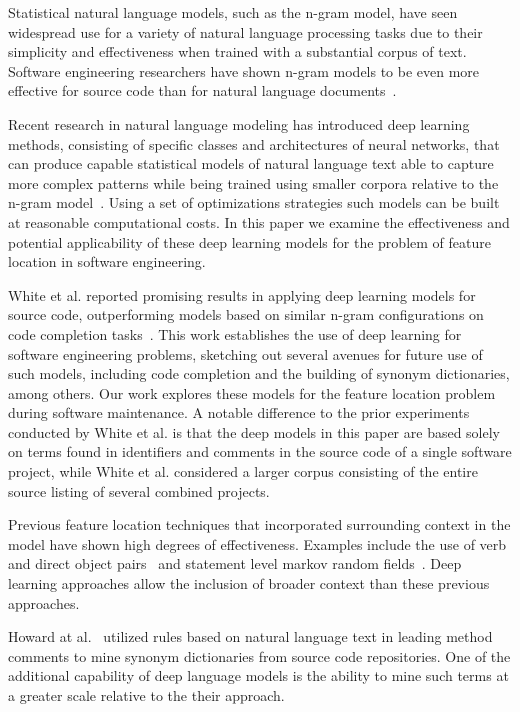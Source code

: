 


%
%
Statistical natural language models, such as the n-gram model, have
seen widespread use for a variety of natural language processing tasks
due to their simplicity and effectiveness when trained with a
substantial corpus of text. Software engineering researchers have
shown n-gram models to be even more effective for source code than for
natural language documents~\cite{hindle_naturalness_2012}. 


Recent research in natural language modeling has introduced deep
learning methods, consisting of specific classes and architectures of
neural networks, that can produce capable statistical models of
natural language text able to capture more complex patterns while
being trained using smaller corpora relative to the n-gram
model~\cite{mikolov_distributed_2013,le_distributed_2014}. Using a set
of optimizations strategies such models can be built at reasonable
computational costs. In this paper we examine the effectiveness and
potential applicability of these deep learning models for the problem
of feature location in software engineering.



White et al. reported promising results in applying deep learning
models for source code, outperforming models based on similar n-gram
configurations on code completion tasks~\cite{white_toward_2015}. This
work establishes the use of deep learning for software engineering
problems, sketching out several avenues for future use of such models,
including code completion and the building of synonym dictionaries,
among others. Our work explores these models for the feature location
problem during software maintenance. A notable difference to the prior
experiments conducted by White et al. is that the deep models in this
paper are based solely on terms found in identifiers and comments in
the source code of a single software project, while White et
al. considered a larger corpus consisting of the entire source listing
of several combined projects.



Previous feature location techniques that incorporated surrounding
context in the model have shown high degrees of
effectiveness. Examples include the use of verb and direct object
pairs~\cite{shepherd_using_2007} and statement level markov random
fields~\cite{hill_use_2014}. Deep learning approaches allow the inclusion
of broader context than these previous approaches.  

Howard at al.~\cite{howard_automatically_2013} utilized rules based on
natural language text in leading method comments to mine synonym
dictionaries from source code repositories. One of the additional
capability of deep language models is the ability to mine such terms
at a greater scale relative to the their approach.
